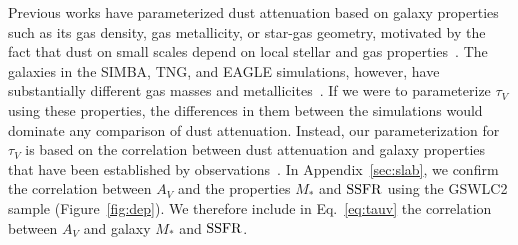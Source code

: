 Previous works have parameterized dust attenuation based on galaxy properties
such as its gas density, gas metallicity, or star-gas geometry, motivated by
the fact that dust on small scales depend on local stellar and gas
properties~\citep[\eg][]{somerville1999, somerville2012, steinacker2013,
camps2015, narayanan2018, trayford2020, vogelsberger2020}. 
The galaxies in the SIMBA, TNG, and EAGLE simulations, however, have
substantially different gas masses and metallicites~\citep[][Maller \etal~in prep.]{dave2020}.  
If we were to parameterize $\tau_V$ using these properties, the differences
in them between the simulations would dominate any comparison of dust attenuation.
Instead, our parameterization for $\tau_V$ is based on the correlation between
dust attenuation and galaxy properties that have been established by
observations~\citep[\eg~][]{garn2010, battisti2016, salim2020}.
In Appendix~\ref{sec:slab}, we confirm the correlation between $A_V$ and
the properties $M_*$ and ${\rm SSFR}$ using the \cite{salim2018} GSWLC2 sample
(Figure~\ref{fig:dep}). 
We therefore include in Eq.~\ref{eq:tauv} the correlation between $A_V$ and
galaxy $M_*$ and ${\rm SSFR}$.



